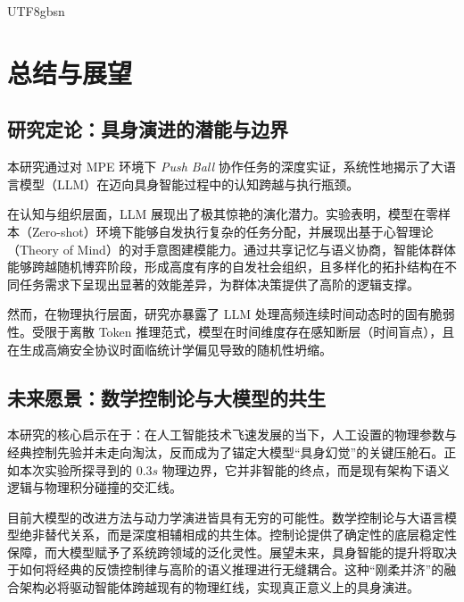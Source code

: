 \documentclass[11pt,a4paper]{article}
\begin{document}
\begin{CJK*}{UTF8}{gbsn}
\section{总结与展望}

\subsection{研究定论：具身演进的潜能与边界}
本研究通过对 MPE 环境下 \textit{Push Ball} 协作任务的深度实证，系统性地揭示了大语言模型（LLM）在迈向具身智能过程中的认知跨越与执行瓶颈。

在认知与组织层面，LLM 展现出了极其惊艳的演化潜力。实验表明，模型在零样本（Zero-shot）环境下能够自发执行复杂的任务分配，并展现出基于心智理论（Theory of Mind）的对手意图建模能力。通过共享记忆与语义协商，智能体群体能够跨越随机博弈阶段，形成高度有序的自发社会组织，且多样化的拓扑结构在不同任务需求下呈现出显著的效能差异，为群体决策提供了高阶的逻辑支撑。

然而，在物理执行层面，研究亦暴露了 LLM 处理高频连续时间动态时的固有脆弱性。受限于离散 Token 推理范式，模型在时间维度存在感知断层（时间盲点），且在生成高熵安全协议时面临统计学偏见导致的随机性坍缩。



\subsection{未来愿景：数学控制论与大模型的共生}
本研究的核心启示在于：在人工智能技术飞速发展的当下，人工设置的物理参数与经典控制先验并未走向淘汰，反而成为了锚定大模型“具身幻觉”的关键压舱石。正如本次实验所探寻到的 $0.3s$ 物理边界，它并非智能的终点，而是现有架构下语义逻辑与物理积分碰撞的交汇线。

目前大模型的改进方法与动力学演进皆具有无穷的可能性。数学控制论与大语言模型绝非替代关系，而是深度相辅相成的共生体。控制论提供了确定性的底层稳定性保障，而大模型赋予了系统跨领域的泛化灵性。展望未来，具身智能的提升将取决于如何将经典的反馈控制律与高阶的语义推理进行无缝耦合。这种“刚柔并济”的融合架构必将驱动智能体跨越现有的物理红线，实现真正意义上的具身演进。

\newpage

\end{CJK*}
\end{document}
